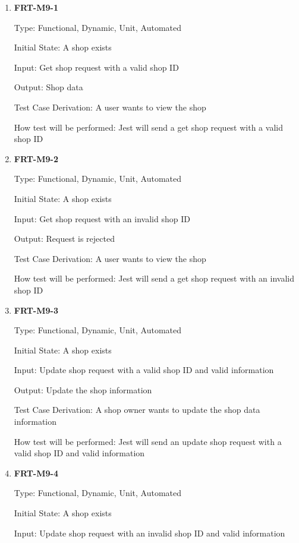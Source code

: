 \documentclass[12pt, titlepage]{article}
\begin{document}
\begin{enumerate}

	\item \textbf{FRT-M9-1}

	      Type: Functional, Dynamic, Unit, Automated

	      Initial State: A shop exists

	      Input: Get shop request with a valid shop ID

	      Output: Shop data

	      Test Case Derivation: A user wants to view the shop

	      How test will be performed: Jest will send a get shop request with a valid shop ID

	\item \textbf{FRT-M9-2}

	      Type: Functional, Dynamic, Unit, Automated

	      Initial State: A shop exists

	      Input: Get shop request with an invalid shop ID

	      Output: Request is rejected

	      Test Case Derivation: A user wants to view the shop

	      How test will be performed: Jest will send a get shop request with an invalid shop ID

	\item \textbf{FRT-M9-3}

	      Type: Functional, Dynamic, Unit, Automated

	      Initial State: A shop exists

	      Input: Update shop request with a valid shop ID and valid information

	      Output: Update the shop information

	      Test Case Derivation: A shop owner wants to update the shop data information

	      How test will be performed: Jest will send an update shop request with a valid shop ID and valid
	      information

	\item \textbf{FRT-M9-4}

	      Type: Functional, Dynamic, Unit, Automated

	      Initial State: A shop exists

	      Input: Update shop request with an invalid shop ID and valid information


\end{enumerate}
\end{document}

